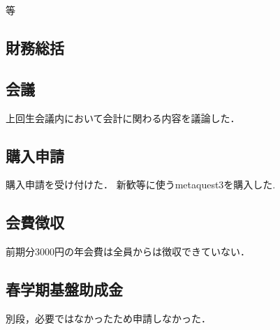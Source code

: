 等\subsection*{財務総括}


\subsection*{会議}
上回生会議内において会計に関わる内容を議論した．

\subsection*{購入申請}
購入申請を受け付けた．
新歓等に使うmetaquest3を購入した.

\subsection*{会費徴収}
前期分3000円の年会費は全員からは徴収できていない．

\subsection*{春学期基盤助成金}
別段，必要ではなかったため申請しなかった．
